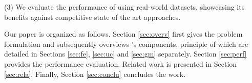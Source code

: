 \stab(3) We evaluate the performance of \sys{} using real-world datasets, showcasing its benefits against competitive state of the art approaches.



Our paper is organized as follows.
Section \ref{sec:overv} first gives the problem formulation and subsequently overviews \sys{}'s components, principle of which are detailed in Sections \ref{sec:fe}, \ref{sec:uc} and \ref{sec:gm} separately.
Section \ref{sec:perf} provides the performance evaluation.
Related work is presented in Section \ref{sec:rela}.
Finally, Section \ref{sec:conclu} concludes the work.











